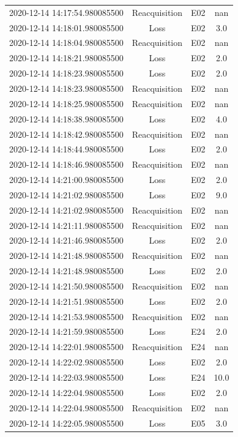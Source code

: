 \begin{enumerate}
\begin{longtabu}{cccc}
2020{-}12{-}14 14:17:54.980085500&Reacquisition&E02&nan\\%
2020{-}12{-}14 14:18:01.980085500&Loss&E02&3.0\\%
2020{-}12{-}14 14:18:04.980085500&Reacquisition&E02&nan\\%
2020{-}12{-}14 14:18:21.980085500&Loss&E02&2.0\\%
2020{-}12{-}14 14:18:23.980085500&Loss&E02&2.0\\%
2020{-}12{-}14 14:18:23.980085500&Reacquisition&E02&nan\\%
2020{-}12{-}14 14:18:25.980085500&Reacquisition&E02&nan\\%
2020{-}12{-}14 14:18:38.980085500&Loss&E02&4.0\\%
2020{-}12{-}14 14:18:42.980085500&Reacquisition&E02&nan\\%
2020{-}12{-}14 14:18:44.980085500&Loss&E02&2.0\\%
2020{-}12{-}14 14:18:46.980085500&Reacquisition&E02&nan\\%
2020{-}12{-}14 14:21:00.980085500&Loss&E02&2.0\\%
2020{-}12{-}14 14:21:02.980085500&Loss&E02&9.0\\%
2020{-}12{-}14 14:21:02.980085500&Reacquisition&E02&nan\\%
2020{-}12{-}14 14:21:11.980085500&Reacquisition&E02&nan\\%
2020{-}12{-}14 14:21:46.980085500&Loss&E02&2.0\\%
2020{-}12{-}14 14:21:48.980085500&Reacquisition&E02&nan\\%
2020{-}12{-}14 14:21:48.980085500&Loss&E02&2.0\\%
2020{-}12{-}14 14:21:50.980085500&Reacquisition&E02&nan\\%
2020{-}12{-}14 14:21:51.980085500&Loss&E02&2.0\\%
2020{-}12{-}14 14:21:53.980085500&Reacquisition&E02&nan\\%
2020{-}12{-}14 14:21:59.980085500&Loss&E24&2.0\\%
2020{-}12{-}14 14:22:01.980085500&Reacquisition&E24&nan\\%
2020{-}12{-}14 14:22:02.980085500&Loss&E02&2.0\\%
2020{-}12{-}14 14:22:03.980085500&Loss&E24&10.0\\%
2020{-}12{-}14 14:22:04.980085500&Loss&E02&2.0\\%
2020{-}12{-}14 14:22:04.980085500&Reacquisition&E02&nan\\%
2020{-}12{-}14 14:22:05.980085500&Loss&E05&3.0\\%

\end{longtabu}
\end{enumerate}
